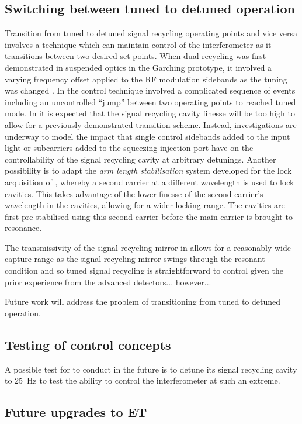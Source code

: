 \subsection{Switching between tuned to detuned operation}
Transition from tuned to detuned signal recycling operating points and vice versa involves a technique which can maintain control of the interferometer as it transitions between two desired set points. When dual recycling was first demonstrated in suspended optics in the Garching prototype, it involved a varying frequency offset applied to the \gls{RF} modulation sidebands as the tuning was changed \cite{Freise2000}. In \GEO{} the control technique involved a complicated sequence of events \cite{Grote2004} including an uncontrolled ``jump'' between two operating points \cite{Hild2007} to reached tuned mode. In \ETLF{} it is expected that the signal recycling cavity finesse will be too high to allow for a previously demonstrated transition scheme. Instead, investigations are underway to model the impact that single control sidebands added to the input light or subcarriers added to the squeezing injection port have on the controllability of the signal recycling cavity at arbitrary detunings. Another possibility is to adapt the \emph{arm length stabilisation} system developed for the lock acquisition of \ALIGO{} \cite{Mullavey2012, Staley2014}, whereby a second carrier at a different wavelength is used to lock cavities. This takes advantage of the lower finesse of the second carrier's wavelength in the cavities, allowing for a wider locking range. The cavities are first pre-stabilised using this second carrier before the main carrier is brought to resonance.

The transmissivity of the signal recycling mirror in \ETLF{} allows for a reasonably wide capture range as the signal recycling mirror swings through the resonant condition and so tuned signal recycling is straightforward to control given the prior experience from the advanced detectors... however...

Future work will address the problem of transitioning \ETLF{} from tuned to detuned operation.

\subsection{Testing of control concepts}
A possible test for \GEOHF{} to conduct in the future is to detune its signal recycling cavity to \SI{25}{\hertz} to test the ability to control the interferometer at such an extreme.

\subsection{Future upgrades to ET}
